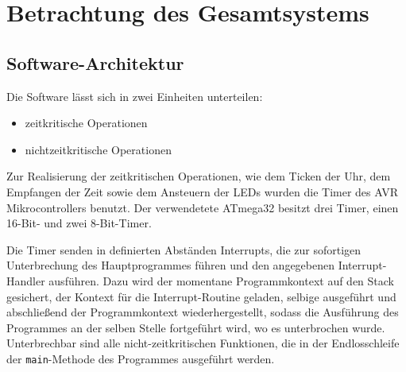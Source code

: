 \section{Betrachtung des Gesamtsystems}
\subsection{Software-Architektur}
Die Software lässt sich in zwei Einheiten unterteilen:
\begin{itemize}
  \item zeitkritische Operationen
  \item nichtzeitkritische Operationen
\end{itemize}
Zur Realisierung der zeitkritischen Operationen, wie dem Ticken der Uhr, dem Empfangen der Zeit sowie dem Ansteuern der LEDs wurden die Timer des AVR Mikrocontrollers benutzt. Der verwendetete ATmega32 besitzt drei Timer, einen 16-Bit- und zwei 8-Bit-Timer.

Die Timer senden in definierten Abständen Interrupts, die zur sofortigen Unterbrechung des Hauptprogrammes führen und den angegebenen Interrupt-Handler ausführen. Dazu wird der momentane Programmkontext auf den Stack gesichert, der Kontext für die Interrupt-Routine geladen, selbige ausgeführt und abschließend der Programmkontext wiederhergestellt, sodass die Ausführung des Programmes an der selben Stelle fortgeführt wird, wo es unterbrochen wurde. Unterbrechbar sind alle nicht-zeitkritischen Funktionen, die in der Endlosschleife der \texttt{main}-Methode des Programmes ausgeführt werden.

